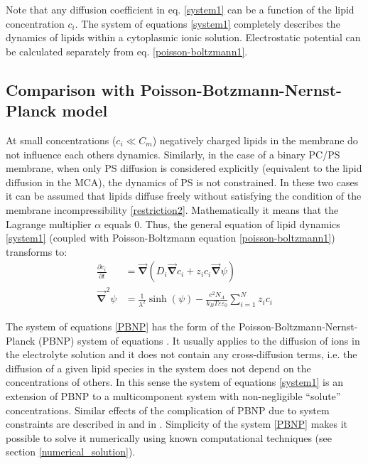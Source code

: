 Note that any diffusion coefficient in eq. \eqref{system1} can be a function of the lipid concentration $c_i$. The system of equations \eqref{system1} completely describes the dynamics of lipids within a cytoplasmic ionic solution. Electrostatic potential can be calculated separately from eq. \eqref{poisson-boltzmann1}.

\subsection{Comparison with Poisson-Botzmann-Nernst-Planck model}

\label{lipid_simplification}

At small concentrations ($c_i\ll C_m$) negatively charged lipids in the membrane do not influence each others dynamics. Similarly, in the case of a binary PC/PS membrane, when only PS diffusion is considered explicitly (equivalent to the lipid diffusion in the MCA), the dynamics of PS is not constrained. In these two cases it can be assumed that lipids diffuse freely without satisfying the condition of the membrane incompressibility \eqref{restriction2}. Mathematically it means that the Lagrange multiplier $\alpha$ equals 0. Thus, the general equation of lipid dynamics \eqref{system1} (coupled with Poisson-Boltzmann equation \eqref{poisson-boltzmann1}) transforms to:
\begin{align}
 \label {PBNP}
\frac{\partial c_i}{\partial t}&=\vec{\mathbf{\nabla}} (D_i\vec{\mathbf{\nabla}} c_i + z_i c_i \vec{\mathbf{\nabla}}\psi) \nonumber \\
\vec{\mathbf{\nabla}}^2 \psi&=\frac{1}{\lambda^2}\sinh(\psi) - \frac{e^2 N_A}{k_B T\varepsilon\varepsilon_0} \sum_{i=1}^N z_i c_i
\end{align}

The system of equations \eqref{PBNP} has the form of the Poisson-Boltzmann-Nernst-Planck (PBNP) system of equations \cite{Zheng2011}. It usually applies to the diffusion of ions in the electrolyte solution and it does not contain any cross-diffusion terms, i.e. the diffusion of a given lipid species in the system does not depend on the concentrations of others. In this sense the system of equations \eqref{system1} is an extension of PBNP to a multicomponent system with non-negligible ``solute'' concentrations. Similar effects of the complication of PBNP due to system constraints are described in \cite{Mills1994} and in \cite{Kilic2007}. Simplicity of the system \eqref{PBNP} makes it possible to solve it numerically using known computational techniques (see section \ref{numerical_solution}).

